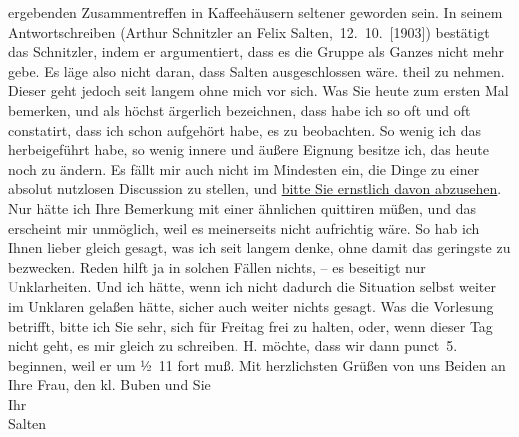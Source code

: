 \begin{ledgroupsized}[t]{13cm}
{{{                  ergebenden Zusammentreffen in Kaffeehäusern seltener geworden sein. In seinem
                  Antwortschreiben (Arthur Schnitzler an Felix Salten, 12. 10. [1903]) bestätigt das
                     Schnitzler, indem er argumentiert, dass
                  es die Gruppe als Ganzes nicht mehr gebe. Es läge also nicht daran, dass Salten ausgeschlossen wäre. }}}\label{K_L03347-2h} theil zu
               nehmen. Dieser geht jedoch seit langem ohne mich vor sich. Was Sie heute zum ersten Mal bemerken, und als höchst ärgerlich
               bezeichnen, dass habe ich so oft und oft constatirt, dass ich schon aufgehört habe,
               es zu beobachten. So wenig ich das herbeigeführt habe, so wenig innere und äußere
               Eignung besitze ich, das heute noch zu ändern. Es fällt mir auch nicht im Mindesten
               ein, die Dinge zu einer absolut nutzlosen Discussion zu stellen, und \uline{bitte Sie ernstlich davon abzusehen}. Nur hätte ich
               Ihre Bemerkung mit einer ähnlichen quittiren müßen, und das erscheint mir unmöglich,
               weil es meinerseits nicht aufrichtig wäre. So hab ich Ihnen lieber gleich gesagt, was
               ich seit langem denke, ohne damit das geringste zu bezwecken. Reden hilft ja in
               solchen Fällen nichts, – es beseitigt nur \textcolor{gray}{U}nklarheiten. Und ich
               hätte, wenn ich nicht dadurch die Situation selbst weiter im Unklaren gelaßen hätte,
               sicher auch weiter nichts gesagt.\pend
           \pstart
           {\pb}Was die Vorlesung betrifft,
               bitte ich Sie sehr, sich für Freitag frei zu halten,
               oder, wenn dieser Tag nicht geht, es mir gleich zu schreiben\textcolor{gray}{.}{ }H. möchte, dass wir dann punct 5.
               beginnen, weil er um ½ 11 fort muß.\pend
           \pstart
           Mit herzlichsten Grüßen von uns Beiden an Ihre Frau,
               den kl. Buben und Sie
               {\\}Ihr {\\}\spacefill\mbox{Salten}\pend
           
         
         \endnumbering{}\end{ledgroupsized}  \newcommand{\dateiname}{L03347}\newcommand{\titel}{Felix Salten an Arthur Schnitzler, [12. 10. 1903]}\newcommand{\editorInnen}{Martin Anton Müller und Laura Untner}
      
